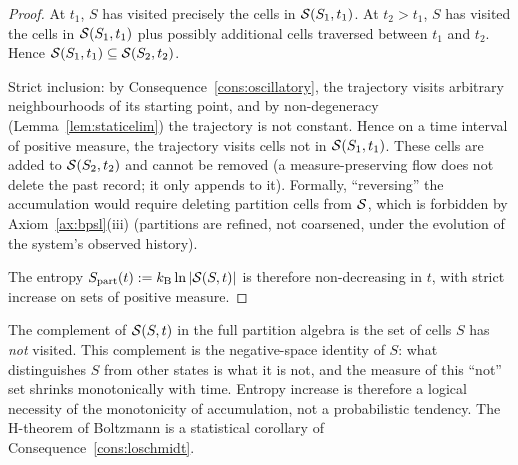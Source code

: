 \begin{proof}
At $t_{1}$, $S$ has visited precisely the cells in $\mathcal{S}(S_{1},t_{1})$. At $t_{2}>t_{1}$, $S$ has visited the cells in $\mathcal{S}(S_{1},t_{1})$ plus possibly additional cells traversed between $t_{1}$ and $t_{2}$. Hence $\mathcal{S}(S_{1},t_{1})\subseteq\mathcal{S}(S_{2},t_{2})$.

Strict inclusion: by Consequence~\ref{cons:oscillatory}, the trajectory visits arbitrary neighbourhoods of its starting point, and by non-degeneracy (Lemma~\ref{lem:staticelim}) the trajectory is not constant. Hence on a time interval of positive measure, the trajectory visits cells not in $\mathcal{S}(S_{1},t_{1})$. These cells are added to $\mathcal{S}(S_{2},t_{2})$ and cannot be removed (a measure-preserving flow does not delete the past record; it only appends to it). Formally, ``reversing'' the accumulation would require deleting partition cells from $\mathcal{S}$, which is forbidden by Axiom~\ref{ax:bpsl}(iii) (partitions are refined, not coarsened, under the evolution of the system's observed history).

The entropy $S_{\mathrm{part}}(t):=k_{\mathrm{B}}\ln|\mathcal{S}(S,t)|$ is therefore non-decreasing in $t$, with strict increase on sets of positive measure.
\end{proof}

\begin{remark}
The complement of $\mathcal{S}(S,t)$ in the full partition algebra is the set of cells $S$ has \emph{not} visited. This complement is the negative-space identity of $S$: what distinguishes $S$ from other states is what it is not, and the measure of this ``not'' set shrinks monotonically with time. Entropy increase is therefore a logical necessity of the monotonicity of accumulation, not a probabilistic tendency. The H-theorem of Boltzmann \citep{boltzmann1877} is a statistical corollary of Consequence~\ref{cons:loschmidt}.
\end{remark}

